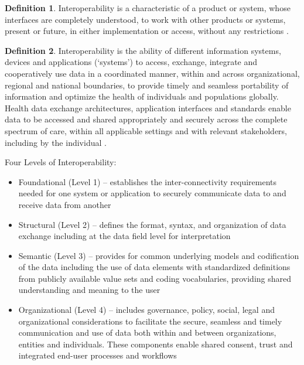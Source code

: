 \documentclass[letterpaper, cleveref]{lipics-v2019}
\theoremstyle{definition}
\newtheorem{defn}{Definition}
\begin{document}
\begin{defn}
  Interoperability is a characteristic of a product or system, whose
  interfaces are completely understood, to work with other products or
  systems, present or future, in either implementation or access, without
  any restrictions \citep{AFUL2019}.
\end{defn}

\begin{defn}
  Interoperability is the ability of different information systems, devices and
  applications (‘systems’) to access, exchange, integrate and cooperatively use
  data in a coordinated manner, within and across organizational, regional and
  national boundaries, to provide timely and seamless portability of information
  and optimize the health of individuals and populations globally. Health data
  exchange architectures, application interfaces and standards enable data to be
  accessed and shared appropriately and securely across the complete spectrum of
  care, within all applicable settings and with relevant stakeholders, including
  by the individual \citep{HIMSS2019}.
	
  Four Levels of Interoperability:
  \begin{itemize}
  \item Foundational (Level 1) – establishes the inter-connectivity requirements
    needed for one system or application to securely communicate data to and
    receive data from another
		
  \item Structural (Level 2) – defines the format, syntax, and organization of
    data exchange including at the data field level for interpretation
		
  \item Semantic (Level 3) – provides for common underlying models and
    codification of the data including the use of data elements with
    standardized definitions from publicly available value sets and coding
    vocabularies, providing shared understanding and meaning to the user
		
  \item Organizational (Level 4) – includes governance, policy, social, legal
    and organizational considerations to facilitate the secure, seamless and
    timely communication and use of data both within and between organizations,
    entities and individuals. These components enable shared consent, trust and
    integrated end-user processes and workflows
  \end{itemize}
\end{defn}
\end{document}
